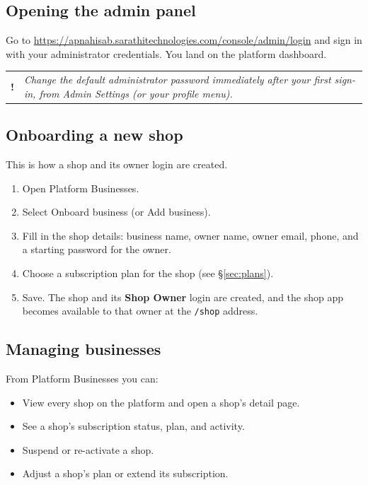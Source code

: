 \documentclass[11pt,a4paper]{article}
\makeatletter
\newcommand{\role}[1]{\textbf{\color{brand}#1}}
\newcommand{\menu}[1]{\textsf{#1}}
\newenvironment{note}
  {\par\medskip\noindent\begin{tabular}{@{}p{0.03\textwidth}p{0.9\textwidth}@{}}
   \textbf{!} & \itshape}
  {\end{tabular}\par\medskip}
\makeatother
\begin{document}
\subsection{Opening the admin panel}
Go to \url{https://apnahisab.sarathitechnologies.com/console/admin/login} and sign
in with your administrator credentials. You land on the platform dashboard.

\begin{note}
Change the default administrator password immediately after your first sign-in,
from \menu{Admin \textrightarrow{} Settings} (or your profile menu).
\end{note}

\subsection{Onboarding a new shop}
This is how a shop and its owner login are created.
\begin{enumerate}
  \item Open \menu{Platform \textrightarrow{} Businesses}.
  \item Select \menu{Onboard business} (or \menu{Add business}).
  \item Fill in the shop details: business name, owner name, owner email,
        phone, and a starting password for the owner.
  \item Choose a subscription plan for the shop (see \S\ref{sec:plans}).
  \item Save. The shop and its \role{Shop Owner} login are created, and the shop
        app becomes available to that owner at the \texttt{/shop} address.
\end{enumerate}

\subsection{Managing businesses}
From \menu{Platform \textrightarrow{} Businesses} you can:
\begin{itemize}
  \item View every shop on the platform and open a shop's detail page.
  \item See a shop's subscription status, plan, and activity.
  \item Suspend or re-activate a shop.
  \item Adjust a shop's plan or extend its subscription.
\end{itemize}
\end{document}
